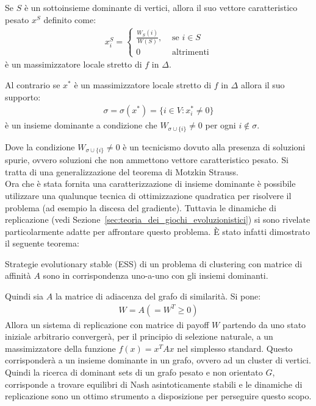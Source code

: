 \begin{thm}
	Se $S$ è un sottoinsieme dominante di vertici, allora il suo vettore caratteristico pesato $x^S$ definito come:
	\begin{align*}
		x^S_i = 
		\begin{cases}
			\frac{W_S(i)}{W(S)}, &\text{ se }i \in S\\
			0 &\text{ altrimenti}
		\end{cases}
	\end{align*}
	è un massimizzatore locale stretto di $f$ in $\Delta$.
	
	Al contrario se $x^*$ è un massimizzatore locale stretto di $f$ in $\Delta$ allora il suo supporto:
	\begin{align*}
		\sigma = \sigma(x^*) = \{ i \in V : x^*_i \neq 0 \}
	\end{align*}
	è un insieme dominante a condizione che $W_{\sigma \cup \{i\}} \neq 0$ per ogni $i \not\in \sigma$. 
\end{thm}
Dove la condizione $W_{\sigma \cup \{i\}} \neq 0$ è un tecnicismo dovuto alla presenza di soluzioni spurie, ovvero soluzioni che non ammettono vettore caratteristico pesato. Si tratta di una generalizzazione del teorema di Motzkin Strauss.\\

Ora che è stata fornita una caratterizzazione di insieme dominante è possibile utilizzare una qualunque tecnica di ottimizzazione quadratica per risolvere il problema (ad esempio la discesa del gradiente). Tuttavia le dinamiche di replicazione (vedi Sezione~\ref{sec:teoria_dei_giochi_evoluzionistici}) si sono rivelate particolarmente adatte per affrontare questo problema. È stato infatti dimostrato il seguente teorema:

\begin{thm}
	Strategie evolutionary stable (ESS) di un problema di clustering con matrice di affinità $A$ sono in corrispondenza uno-a-uno con gli insiemi dominanti.
\end{thm}

\newpage

Quindi sia $A$ la matrice di adiacenza del grafo di similarità. Si pone:
\begin{align*}
	W = A (= W^T \geq 0)
\end{align*}
Allora un sistema di replicazione con matrice di payoff $W$ partendo da uno stato iniziale arbitrario convergerà, per il principio di selezione naturale, a un massimizzatore della funzione $f(x) = x^T A x$ nel simplesso standard. Questo corrisponderà a un insieme dominante in un grafo, ovvero ad un cluster di vertici. Quindi la ricerca di dominant sets di un grafo pesato e non orientato $G$, corrisponde a trovare equilibri di Nash asintoticamente stabili e le dinamiche di replicazione sono un ottimo strumento a disposizione per perseguire questo scopo.\\

